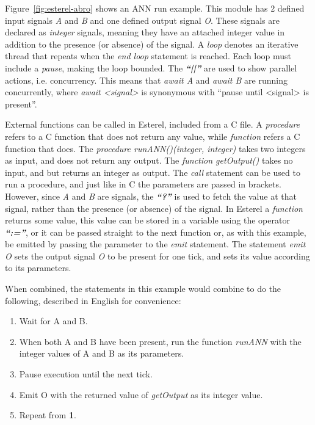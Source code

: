 Figure~\ref{fig:esterel-abro} shows an \ac{ANN} run example.
This module has 2 defined input signals \textit{A} and \textit{B} and one defined output signal \textit{O}.
These signals are declared as \textit{integer} signals, meaning they have an attached integer value in addition to the presence (or absence) of the signal.
A \textit{loop} denotes an iterative thread that repeats when the \textit{end loop} statement is reached.
Each loop must include a \textit{pause}, making the loop bounded. 
The \textbf{\emph{``||''}} are used to show parallel actions, i.e. concurrency.
This means that \textit{await A} and \textit{await B} are running concurrently, where \textit{await <signal>} is synonymous with ``pause until <signal> is present''.

External functions can be called in Esterel, included from a C file.
A \textit{procedure} refers to a C function that does not return any value, while \textit{function} refers a C function that does.
The \textit{procedure runANN()(integer, integer)} takes two integers as input, and does not return any output.
The \textit{function getOutput()} takes no input, and but returns an integer as output.
The \textit{call} statement can be used to run a procedure, and just like in C the parameters are passed in brackets.
However, since \textit{A} and \textit{B} are signals, the \textbf{\emph{``?''}} is used to fetch the value at that signal, rather than the presence (or absence) of the signal.
In Esterel a \textit{function} returns some value, this value can be stored in a variable using the operator \textbf{\emph{``:=''}}, or it can be passed straight to the next function or, as with this example, be emitted by passing the parameter to the \textit{emit} statement.
The statement \textit{emit O} sets the output signal \textit{O} to be present for one tick, and sets its value according to its parameters.

When combined, the statements in this example would combine to do the following, described in English for convenience:
\begin{enumerate}
	\item Wait for A and B. 
	\item When both A and B have been present, run the function \textit{runANN} with the integer values of A and B as its parameters.
	\item Pause execution until the next tick.
	\item Emit O with the returned value of \textit{getOutput} as its integer value.
	\item Repeat from \textbf{1}.
\end{enumerate}

